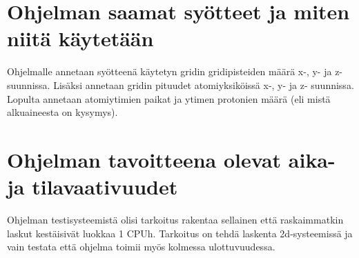 \documentclass{article}
\begin{document}
\section{Ohjelman saamat syötteet ja miten niitä käytetään}
Ohjelmalle annetaan syötteenä käytetyn gridin gridipisteiden määrä x-,
y- ja z- suunnissa. Lisäksi annetaan gridin pituudet atomiyksiköissä
x-, y- ja z- suunnissa. Lopulta annetaan atomiytimien paikat ja ytimen
protonien määrä (eli mistä alkuaineesta on kysymys).

\section{Ohjelman tavoitteena olevat aika- ja tilavaativuudet}
Ohjelman testisysteemistä olisi tarkoitus rakentaa sellainen että
raskaimmatkin laskut kestäisivät luokkaa 1 CPUh. Tarkoitus on tehdä
laskenta 2d-systeemissä ja vain testata että ohjelma toimii myös
kolmessa ulottuvuudessa.






\end{document}
